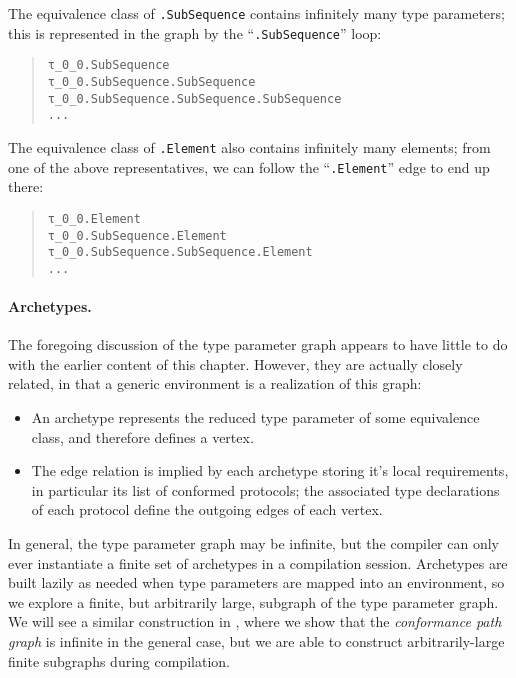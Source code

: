 \documentclass[../generics]{subfiles}
\begin{document}
\begin{example}
\begin{quote}
\begin{tikzpicture}
\end{tikzpicture}
\end{quote}
The equivalence class of \texttt{.SubSequence} contains infinitely many type parameters; this is represented in the graph by the ``\texttt{.SubSequence}'' loop:
\begin{quote}
\begin{verbatim}
τ_0_0.SubSequence
τ_0_0.SubSequence.SubSequence
τ_0_0.SubSequence.SubSequence.SubSequence
...
\end{verbatim}
\end{quote}
The equivalence class of \texttt{.Element} also contains infinitely many elements; from one of the above representatives, we can follow the ``\texttt{.Element}'' edge to end up there:
\begin{quote}
\begin{verbatim}
τ_0_0.Element
τ_0_0.SubSequence.Element
τ_0_0.SubSequence.SubSequence.Element
...
\end{verbatim}
\end{quote}
\end{example}

\paragraph{Archetypes.} The foregoing discussion of the type parameter graph appears to have little to do with the earlier content of this chapter. However, they are actually closely related, in that a generic environment is a realization of this graph:
\begin{itemize}
\item An archetype represents the reduced type parameter of some equivalence class, and therefore defines a vertex.
\item The edge relation is implied by each archetype storing it's local requirements, in particular its list of conformed protocols; the associated type declarations of each protocol define the outgoing edges of each vertex.
\end{itemize}
In general, the type parameter graph may be infinite, but the compiler can only ever instantiate a finite set of archetypes in a compilation session. Archetypes are built lazily as needed when type parameters are mapped into an environment, so we explore a finite, but arbitrarily large, subgraph of the type parameter graph. We will see a similar construction in , where we show that the \emph{conformance path graph} is infinite in the general case, but we are able to construct arbitrarily-large finite subgraphs during compilation.
\end{document}

